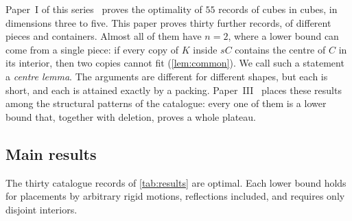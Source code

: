 \documentclass[11pt,a4paper]{article}
\begin{document}
Paper~I of this series~\cite{cubecentre} proves the optimality of $55$ records of cubes in cubes, in dimensions three to five. This paper proves thirty further records, of different pieces and containers. Almost all of them have $n=2$, where a lower bound can come from a single piece: if every copy of $K$ inside $sC$ contains the centre of $C$ in its interior, then two copies cannot fit (\cref{lem:common}). We call such a statement a \emph{centre lemma}. The arguments are different for different shapes, but each is short, and each is attained exactly by a packing. Paper~III~\cite{patterns} places these results among the structural patterns of the catalogue: every one of them is a lower bound that, together with deletion, proves a whole plateau.

\subsection{Main results}

\begin{maintheorem}
The thirty catalogue records of \cref{tab:results} are optimal. Each lower bound holds for placements by arbitrary rigid motions, reflections included, and requires only disjoint interiors.
\end{maintheorem}
\end{document}
